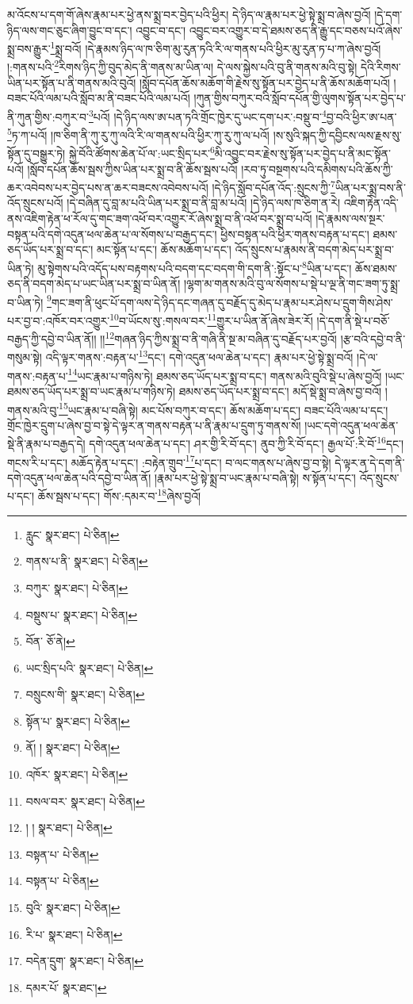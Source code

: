 མ་འོངས་པ་དག་གོ་ཞེས་རྣམ་པར་ཕྱེ་ནས་སྨྲ་བར་བྱེད་པའི་ཕྱིར། དེ་ཉིད་ལ་རྣམ་པར་ཕྱེ་སྟེ་སྨྲ་བ་ཞེས་བྱའོ། །དེ་དག་ཉིད་ལས་གང་ཅུང་ཞིག་བྱུང་བ་དང་། འབྱུང་བ་དང་། འབྱུང་བར་འགྱུར་བ་དེ་ཐམས་ཅད་ནི་རྒྱུ་དང་བཅས་པའོ་ཞེས་སྨྲ་བས་རྒྱུར་\footnote{རླུང་  སྣར་ཐང་།  པེ་ཅིན། }སྨྲ་བའོ། །དེ་རྣམས་ཉིད་ལ་ཁ་ཅིག་མུ་རུན་ཏའི་རི་ལ་གནས་པའི་ཕྱིར་མུ་རུན་ཏ་པ་ཀ་ཞེས་བྱའོ། །:གནས་པའི་\footnote{གནས་པ་ནི་  སྣར་ཐང་།  པེ་ཅིན། }རིགས་ཉིད་ཀྱི་བུད་མེད་ནི་གནས་མ་ཡིན་ལ། དེ་ལས་སྐྱེས་པའི་བུ་ནི་གནས་མའི་བུ་སྟེ། དེའི་རིགས་ཡིན་པར་སྟོན་པ་ནི་གནས་མའི་བུའོ། །སློབ་དཔོན་ཆོས་མཆོག་གི་རྗེས་སུ་སྟོན་པར་བྱེད་པ་ནི་ཆོས་མཆོག་པའོ། །བཟང་པོའི་ལམ་པའི་སློབ་མ་ནི་བཟང་པོའི་ལམ་པའོ། །ཀུན་གྱིས་བཀུར་བའི་སློབ་དཔོན་གྱི་ལུགས་སྟོན་པར་བྱེད་པ་ནི་ཀུན་གྱིས་:བཀུར་བ་\footnote{བཀུར་  སྣར་ཐང་།  པེ་ཅིན། }པའོ། །དེ་ཉིད་ལས་ཨ་པན་ཏའི་གྲོང་ཁྱེར་དུ་ཡང་དག་པར་:བསྡུ་བ་\footnote{བསྡུས་པ་  སྣར་ཐང་།  པེ་ཅིན། }བྱ་བའི་ཕྱིར་ཨ་པན་\footnote{བོན་  ཅོ་ནེ། }ཏ་ཀ་པའོ། །ཁ་ཅིག་ནི་ཀུ་རུ་ཀུ་ལའི་རི་ལ་གནས་པའི་ཕྱིར་ཀུ་རུ་ཀུ་ལ་པའོ། །ས་སུའི་སྐད་ཀྱི་དབྱིངས་ལས་རྗས་སུ་སྟོན་དུ་བསྒྱུར་ཏེ། སྐྱེ་བོའི་ཚོགས་ཆེན་པོ་ལ་:ཡང་སྲིད་པར་\footnote{ཡང་སྲིད་པའི་  སྣར་ཐང་།  པེ་ཅིན། }མི་འབྱུང་བར་རྗེས་སུ་སྟོན་པར་བྱེད་པ་ནི་མང་སྟོན་པའོ། །སློབ་དཔོན་ཆོས་སྦས་ཀྱིས་ཡིན་པར་སྨྲ་བ་ནི་ཆོས་སྦས་པའོ། །རབ་ཏུ་བསྔགས་པའི་དམིགས་པའི་ཆོས་ཀྱི་ཆར་འབེབས་པར་བྱེད་པས་ན་ཆར་བཟངས་འབེབས་པའོ། །དེ་ཉིད་སློབ་དཔོན་འོད་:སྲུངས་ཀྱི་\footnote{བསྲུངས་གི་  སྣར་ཐང་།  པེ་ཅིན། }ཡིན་པར་སྨྲ་བས་ནི་འོད་སྲུངས་པའོ། །དེ་བཞིན་དུ་བླ་མ་པའི་ཡིན་པར་སྨྲ་བ་ནི་བླ་མ་པའོ། །དེ་ཉིད་ལས་ཁ་ཅིག་ན་རེ། འཇིག་རྟེན་འདི་ནས་འཇིག་རྟེན་ཕ་རོལ་དུ་གང་ཟག་འཕོ་བར་འགྱུར་རོ་ཞེས་སྨྲ་བ་ནི་འཕོ་བར་སྨྲ་བ་པའོ། །དེ་རྣམས་ལས་སྔར་བསྟན་པའི་དགེ་འདུན་ཕལ་ཆེན་པ་ལ་སོགས་པ་བརྒྱད་དང་། ཕྱིས་བསྟན་པའི་ཕྱིར་གནས་བརྟན་པ་དང་། ཐམས་ཅད་ཡོད་པར་སྨྲ་བ་དང་། མང་སྟོན་པ་དང་། ཆོས་མཆོག་པ་དང་། འོད་སྲུངས་པ་རྣམས་ནི་བདག་མེད་པར་སྨྲ་བ་ཡིན་ཏེ། མུ་སྟེགས་པའི་འདོད་པས་བརྟགས་པའི་བདག་དང་བདག་གི་དག་ནི་:སྟོང་པ་\footnote{སྟོན་པ་  སྣར་ཐང་།  པེ་ཅིན། }ཡིན་པ་དང་། ཆོས་ཐམས་ཅད་ནི་བདག་མེད་པ་ཡང་ཡིན་པར་སྨྲ་བ་ཡིན་ནོ། །ལྷག་མ་གནས་མའི་བུ་ལ་སོགས་པ་སྡེ་པ་ལྔ་ནི་གང་ཟག་ཏུ་སྨྲ་བ་ཡིན་ཏེ། \footnote{ནོ། །   སྣར་ཐང་།  པེ་ཅིན། }གང་ཟག་ནི་ཕུང་པོ་དག་ལས་དེ་ཉིད་དང་གཞན་དུ་བརྗོད་དུ་མེད་པ་རྣམ་པར་ཤེས་པ་དྲུག་གིས་ཤེས་པར་བྱ་བ་:འཁོར་བར་འགྱུར་\footnote{འཁོར་  སྣར་ཐང་།  པེ་ཅིན། }བ་ཡོངས་སུ་:གསལ་བར་\footnote{བསལ་བར་  སྣར་ཐང་།  པེ་ཅིན། }གྱུར་པ་ཡིན་ནོ་ཞེས་ཟེར་རོ། །དེ་དག་ནི་སྡེ་པ་བཅོ་བརྒྱད་ཀྱི་དབྱེ་བ་ཡིན་ནོ།། །།\footnote{། །  སྣར་ཐང་།  པེ་ཅིན། }གཞན་ཉིད་ཀྱིས་སྨྲ་བ་ནི་གཞི་ནི་སྔ་མ་བཞིན་དུ་བརྗོད་པར་བྱའོ། །རྩ་བའི་དབྱེ་བ་ནི་གསུམ་སྟེ། འདི་ལྟར་གནས་:བརྟན་པ་\footnote{བསྟན་པ་  པེ་ཅིན། }དང་། དགེ་འདུན་ཕལ་ཆེན་པ་དང་། རྣམ་པར་ཕྱེ་སྟེ་སྨྲ་བའོ། །དེ་ལ་གནས་:བརྟན་པ་\footnote{བསྟན་པ་  པེ་ཅིན། }ཡང་རྣམ་པ་གཉིས་ཏེ། ཐམས་ཅད་ཡོད་པར་སྨྲ་བ་དང་། གནས་མའི་བུའི་སྡེ་པ་ཞེས་བྱའོ། །ཡང་ཐམས་ཅད་ཡོད་པར་སྨྲ་བ་ཡང་རྣམ་པ་གཉིས་ཏེ། ཐམས་ཅད་ཡོད་པར་སྨྲ་བ་དང་། མདོ་སྡེ་སྨྲ་བ་ཞེས་བྱ་བའོ། །གནས་མའི་བུ་\footnote{བུའི་  སྣར་ཐང་།  པེ་ཅིན། }ཡང་རྣམ་པ་བཞི་སྟེ། མང་པོས་བཀུར་བ་དང་། ཆོས་མཆོག་པ་དང་། བཟང་པོའི་ལམ་པ་དང་། གྲོང་ཁྱེར་དྲུག་པ་ཞེས་བྱ་བ་སྟེ་དེ་ལྟར་ན་གནས་བརྟན་པ་ནི་རྣམ་པ་དྲུག་ཏུ་གནས་སོ། །ཡང་དགེ་འདུན་ཕལ་ཆེན་སྡེ་ནི་རྣམ་པ་བརྒྱད་དེ། དགེ་འདུན་ཕལ་ཆེན་པ་དང་། ཤར་གྱི་རི་བོ་དང་། ནུབ་ཀྱི་རི་བོ་དང་། རྒྱལ་པོ་:རི་བོ་\footnote{རི་པ་  སྣར་ཐང་།  པེ་ཅིན། }དང་། གངས་རི་པ་དང་། མཆོད་རྟེན་པ་དང་། :བརྟེན་གྲུབ་\footnote{བདེན་དྲུག་  སྣར་ཐང་།  པེ་ཅིན། }པ་དང་། བ་ལང་གནས་པ་ཞེས་བྱ་བ་སྟེ། དེ་ལྟར་ན་དེ་དག་ནི་དགེ་འདུན་ཕལ་ཆེན་པའི་དབྱེ་བ་ཡིན་ནོ། །རྣམ་པར་ཕྱེ་སྟེ་སྨྲ་བ་ཡང་རྣམ་པ་བཞི་སྟེ། ས་སྟོན་པ་དང་། འོད་སྲུངས་པ་དང་། ཆོས་སྦས་པ་དང་། གོས་:དམར་བ་\footnote{དམར་པོ་  སྣར་ཐང་། }ཞེས་བྱའོ། 